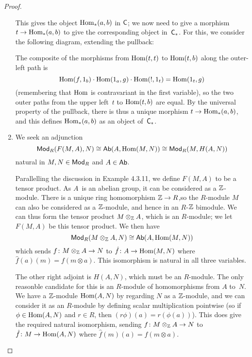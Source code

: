 \documentclass[../../solutions]{subfiles}
\begin{document}
\begin{proof}
\begin{enumerate}[label=(\roman*)]
    This gives the object $\operatorname{Hom}_*(a,b)$ in ${\mathsf{C}}$; we now need to give
    a morphism $t\to\operatorname{Hom}_*(a,b)$ to give the corresponding object
    in~${\mathsf{C}}_*$.  For this, we consider the following diagram,
    extending the pullback:
    \begin{center}
    \end{center}
    The composite of the morphisms from $\operatorname{Hom}(t,t)$ to $\operatorname{Hom}(t,b)$ along
    the outer-left path is
    $$\operatorname{Hom}(f,1_b)\cdot \operatorname{Hom}(1_a,g) \cdot \operatorname{Hom}(!,1_t) = \operatorname{Hom}(1_t,g)$$
    (remembering that $\operatorname{Hom}$ is contravariant in the first variable),
    so the two outer paths from the upper left~$t$ to $\operatorname{Hom}(t,b)$ are
    equal.  By the universal property of the pullback, there is thus a
    unique morphism $t\to\operatorname{Hom}_*(a,b)$, and this defines $\operatorname{Hom}_*(a,b)$
    as an object of~${\mathsf{C}}_*$.

  \item We seek an adjunction
    $$\mathsf{Mod}_{R}(F(M,A),N) \cong \mathsf{Ab}(A,\operatorname{Hom}(M,N)) \cong
    \mathsf{Mod}_{R}(M,H(A,N))$$
    natural in $M,N\in\mathsf{Mod}_{R}$ and $A\in\mathsf{Ab}$.

    Parallelling the discussion in Example 4.3.11, we define $F(M,A)$
    to be a tensor product.  As $A$~is an abelian group, it can be
    considered as a ${\mathbb{Z}}$-module.  There is a unique ring homomorphism
    ${\mathbb{Z}}\to R$,so the $R$-module $M$ can also be considered as a
    ${\mathbb{Z}}$-module, and hence in an $R$-${\mathbb{Z}}$ bimodule.  We can thus
    form the tensor product $M\otimes_{\mathbb{Z}} A$, which is an $R$-module;
    we let $F(M,A)$ be this tensor product.  We then have
    $$\mathsf{Mod}_{R}(M\otimes_{\mathbb{Z}} A,N) \cong \mathsf{Ab}(A,\operatorname{Hom}(M,N))$$
    which sends ${f}\colon{M\otimes_{\mathbb{Z}}A}\to{N}$ to
    ${\hat{f}}\colon{A}\to{\operatorname{Hom}(M,N)}$ where $\hat{f}(a)(m)=f(m\otimes
    a)$.  This isomorphism is natural in all three variables.

    The other right adjoint is $H(A,N)$, which must be an $R$-module.
    The only reasonble candidate for this is an $R$-module of
    homomorphisms from $A$ to~$N$.  We have a ${\mathbb{Z}}$-module
    $\operatorname{Hom}(A,N)$ by regarding $N$ as a ${\mathbb{Z}}$-module, and we can
    consider it as an $R$-module by defining scalar multiplication
    pointwise (so if $\phi\in\operatorname{Hom}(A,N)$ and $r\in R$, then
    $(r\phi)(a)=r(\phi(a))$).  This does give the required natural
    isomorphism, sending ${f}\colon{M\otimes_{\mathbb{Z}}A}\to{N}$ to
    ${\hat{f}}\colon{M}\to{\operatorname{Hom}(A,N)}$ where $\hat{f}(m)(a)=f(m\otimes
    a)$.


\end{enumerate}
\end{proof}
\end{document}
